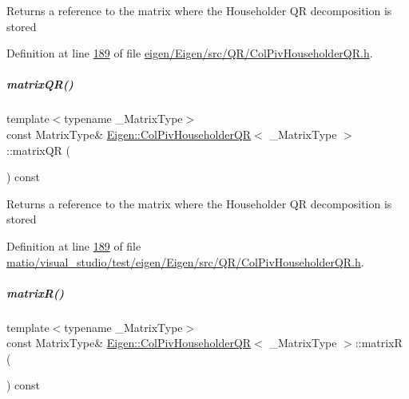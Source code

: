 \begin{DoxyReturn}{Returns}
a reference to the matrix where the Householder QR decomposition is stored 
\end{DoxyReturn}


Definition at line \hyperlink{eigen_2_eigen_2src_2_q_r_2_col_piv_householder_q_r_8h_source_l00189}{189} of file \hyperlink{eigen_2_eigen_2src_2_q_r_2_col_piv_householder_q_r_8h_source}{eigen/\+Eigen/src/\+Q\+R/\+Col\+Piv\+Householder\+Q\+R.\+h}.

\mbox{\label{group___q_r___module_aa572ac050c8d4fadd4f08a87f6b1e62b}} 
\subparagraph{\texorpdfstring{matrix\+Q\+R()}{matrixQR()}\hspace{0.1cm}{\footnotesize\ttfamily [2/2]}}
{\footnotesize\ttfamily template$<$typename \+\_\+\+Matrix\+Type$>$ \\
const Matrix\+Type\& \hyperlink{group___q_r___module_class_eigen_1_1_col_piv_householder_q_r}{Eigen\+::\+Col\+Piv\+Householder\+QR}$<$ \+\_\+\+Matrix\+Type $>$\+::matrix\+QR (\begin{DoxyParamCaption}{ }\end{DoxyParamCaption}) const\hspace{0.3cm}{\ttfamily [inline]}}

\begin{DoxyReturn}{Returns}
a reference to the matrix where the Householder QR decomposition is stored 
\end{DoxyReturn}


Definition at line \hyperlink{matio_2visual__studio_2test_2eigen_2_eigen_2src_2_q_r_2_col_piv_householder_q_r_8h_source_l00189}{189} of file \hyperlink{matio_2visual__studio_2test_2eigen_2_eigen_2src_2_q_r_2_col_piv_householder_q_r_8h_source}{matio/visual\+\_\+studio/test/eigen/\+Eigen/src/\+Q\+R/\+Col\+Piv\+Householder\+Q\+R.\+h}.

\mbox{\label{group___q_r___module_a44c534d47bde6b67ce4b5247d142ef30}} 
\subparagraph{\texorpdfstring{matrix\+R()}{matrixR()}\hspace{0.1cm}{\footnotesize\ttfamily [1/2]}}
{\footnotesize\ttfamily template$<$typename \+\_\+\+Matrix\+Type$>$ \\
const Matrix\+Type\& \hyperlink{group___q_r___module_class_eigen_1_1_col_piv_householder_q_r}{Eigen\+::\+Col\+Piv\+Householder\+QR}$<$ \+\_\+\+Matrix\+Type $>$\+::matrixR (\begin{DoxyParamCaption}{ }\end{DoxyParamCaption}) const\hspace{0.3cm}{\ttfamily [inline]}}

